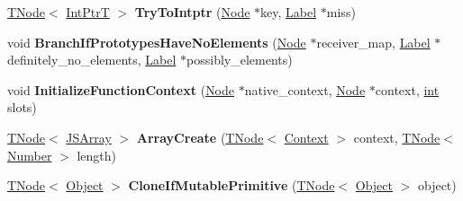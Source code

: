 \begin{DoxyCompactItemize}
\mbox{\hyperlink{classv8_1_1internal_1_1compiler_1_1TNode}{T\+Node}}$<$ \mbox{\hyperlink{structv8_1_1internal_1_1IntPtrT}{Int\+PtrT}} $>$ {\bfseries Try\+To\+Intptr} (\mbox{\hyperlink{classv8_1_1internal_1_1compiler_1_1Node}{Node}} $\ast$key, \mbox{\hyperlink{classv8_1_1internal_1_1compiler_1_1CodeAssemblerLabel}{Label}} $\ast$miss)
\item 
\mbox{\label{classv8_1_1internal_1_1CodeStubAssembler_a539ae1733c08d94ee187f5fef856d4c5}} 
void {\bfseries Branch\+If\+Prototypes\+Have\+No\+Elements} (\mbox{\hyperlink{classv8_1_1internal_1_1compiler_1_1Node}{Node}} $\ast$receiver\+\_\+map, \mbox{\hyperlink{classv8_1_1internal_1_1compiler_1_1CodeAssemblerLabel}{Label}} $\ast$definitely\+\_\+no\+\_\+elements, \mbox{\hyperlink{classv8_1_1internal_1_1compiler_1_1CodeAssemblerLabel}{Label}} $\ast$possibly\+\_\+elements)
\item 
\mbox{\label{classv8_1_1internal_1_1CodeStubAssembler_a05f1d86fd440f4dfc3860ae58b0bfbe1}} 
void {\bfseries Initialize\+Function\+Context} (\mbox{\hyperlink{classv8_1_1internal_1_1compiler_1_1Node}{Node}} $\ast$native\+\_\+context, \mbox{\hyperlink{classv8_1_1internal_1_1compiler_1_1Node}{Node}} $\ast$context, \mbox{\hyperlink{classint}{int}} slots)
\item 
\mbox{\label{classv8_1_1internal_1_1CodeStubAssembler_a84a442492f3a5ee4c7295762fadac564}} 
\mbox{\hyperlink{classv8_1_1internal_1_1compiler_1_1TNode}{T\+Node}}$<$ \mbox{\hyperlink{classv8_1_1internal_1_1JSArray}{J\+S\+Array}} $>$ {\bfseries Array\+Create} (\mbox{\hyperlink{classv8_1_1internal_1_1compiler_1_1TNode}{T\+Node}}$<$ \mbox{\hyperlink{classv8_1_1internal_1_1Context}{Context}} $>$ context, \mbox{\hyperlink{classv8_1_1internal_1_1compiler_1_1TNode}{T\+Node}}$<$ \mbox{\hyperlink{structv8_1_1internal_1_1UnionT}{Number}} $>$ length)
\item 
\mbox{\label{classv8_1_1internal_1_1CodeStubAssembler_af8570c75b1f100581818311b41123070}} 
\mbox{\hyperlink{classv8_1_1internal_1_1compiler_1_1TNode}{T\+Node}}$<$ \mbox{\hyperlink{classv8_1_1internal_1_1Object}{Object}} $>$ {\bfseries Clone\+If\+Mutable\+Primitive} (\mbox{\hyperlink{classv8_1_1internal_1_1compiler_1_1TNode}{T\+Node}}$<$ \mbox{\hyperlink{classv8_1_1internal_1_1Object}{Object}} $>$ object)

\end{DoxyCompactItemize}
